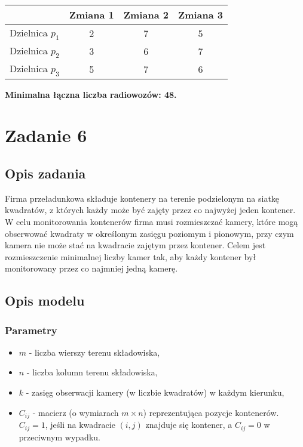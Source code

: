 \documentclass{article}
\begin{document}
\begin{table}[H]
    \centering
    \begin{tabular}{|c|c|c|c|}
        \hline
        & Zmiana 1 & Zmiana 2 & Zmiana 3 \\
        \hline
        Dzielnica $p_1$ & 2 & 7 & 5 \\
        Dzielnica $p_2$ & 3 & 6 & 7 \\
        Dzielnica $p_3$ & 5 & 7 & 6 \\
        \hline
    \end{tabular}
\end{table}

\noindent \textbf{Minimalna łączna liczba radiowozów: 48.}

\section{Zadanie 6}
\subsection{Opis zadania}
Firma przeładunkowa składuje kontenery na terenie podzielonym na siatkę kwadratów, z których każdy może być zajęty przez co najwyżej jeden kontener.
W celu monitorowania kontenerów firma musi rozmieszczać kamery, które mogą obserwować kwadraty w określonym zasięgu poziomym i pionowym, przy czym kamera nie może stać na kwadracie zajętym przez kontener.
Celem jest rozmieszczenie minimalnej liczby kamer tak, aby każdy kontener był monitorowany przez co najmniej jedną kamerę.

\subsection{Opis modelu}
\subsubsection{Parametry}
\begin{itemize}
    \item $m$ - liczba wierszy terenu składowiska,
    \item $n$ - liczba kolumn terenu składowiska,
    \item $k$ - zasięg obserwacji kamery (w liczbie kwadratów) w każdym kierunku,
    \item $C_{ij}$ - macierz (o wymiarach $m \times n$) reprezentująca pozycje kontenerów. $C_{ij} = 1$, jeśli na kwadracie $(i,j)$ znajduje się kontener, a $C_{ij} = 0$ w przeciwnym wypadku.
\end{itemize}
\end{document}
